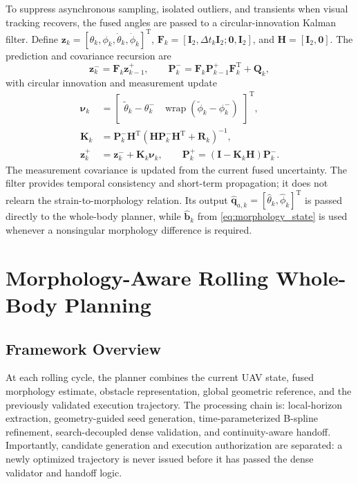 \documentclass[journal,twoside]{IEEEtran}
\newcommand{\wrap}{\operatorname{wrap}}
\begin{document}
To suppress asynchronous sampling, isolated outliers, and transients when visual tracking recovers, the fused angles are passed to a circular-innovation Kalman filter. Define $\mathbf z_k=[\theta_k,\phi_k,\dot\theta_k,\dot\phi_k]^{\mathrm T}$, $\mathbf F_k=[\mathbf I_2,\Delta t_k\mathbf I_2;\mathbf 0,\mathbf I_2]$, and $\mathbf H=[\mathbf I_2,\mathbf 0]$. The prediction and covariance recursion are
\begin{equation}
\mathbf z_k^-=\mathbf F_k\mathbf z_{k-1}^+,
\qquad
\mathbf P_k^-=\mathbf F_k\mathbf P_{k-1}^+\mathbf F_k^{\mathrm T}+\mathbf Q_k,
\label{eq:filter_predict}
\end{equation}
with circular innovation and measurement update
\begin{equation}
\begin{aligned}
\boldsymbol\nu_k&=
\begin{bmatrix}
\tilde\theta_k-\theta_k^-&
\wrap(\tilde\phi_k-\phi_k^-)
\end{bmatrix}^{\!\mathrm T},\\
\mathbf K_k&=\mathbf P_k^-\mathbf H^{\mathrm T}
(\mathbf H\mathbf P_k^-\mathbf H^{\mathrm T}+\mathbf R_k)^{-1},\\
\mathbf z_k^+&=\mathbf z_k^-+\mathbf K_k\boldsymbol\nu_k,\qquad
\mathbf P_k^+=(\mathbf I-\mathbf K_k\mathbf H)\mathbf P_k^-.
\end{aligned}
\label{eq:filter_update}
\end{equation}
The measurement covariance is updated from the current fused uncertainty. The filter provides temporal consistency and short-term propagation; it does not relearn the strain-to-morphology relation. Its output $\hat{\mathbf q}_{a,k}=[\hat\theta_k,\hat\phi_k]^{\mathrm T}$ is passed directly to the whole-body planner, while $\hat{\mathbf b}_k$ from \eqref{eq:morphology_state} is used whenever a nonsingular morphology difference is required.

\section{Morphology-Aware Rolling Whole-Body Planning}
\subsection{Framework Overview}
At each rolling cycle, the planner combines the current UAV state, fused morphology estimate, obstacle representation, global geometric reference, and the previously validated execution trajectory. The processing chain is: local-horizon extraction, geometry-guided seed generation, time-parameterized B-spline refinement, search-decoupled dense validation, and continuity-aware handoff. Importantly, candidate generation and execution authorization are separated: a newly optimized trajectory is never issued before it has passed the dense validator and handoff logic.
\end{document}
